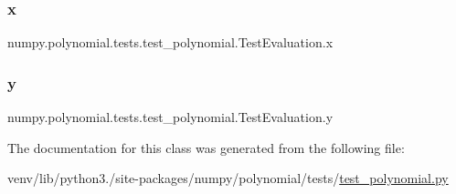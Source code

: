 \subsubsection{\texorpdfstring{x}{x}}
{\footnotesize\ttfamily numpy.\+polynomial.\+tests.\+test\+\_\+polynomial.\+Test\+Evaluation.\+x\hspace{0.3cm}{\ttfamily [static]}}

\mbox{\label{classnumpy_1_1polynomial_1_1tests_1_1test__polynomial_1_1TestEvaluation_a8169409047fd07dce7588fe2c25d59bf}} 
\subsubsection{\texorpdfstring{y}{y}}
{\footnotesize\ttfamily numpy.\+polynomial.\+tests.\+test\+\_\+polynomial.\+Test\+Evaluation.\+y\hspace{0.3cm}{\ttfamily [static]}}



The documentation for this class was generated from the following file\+:\begin{DoxyCompactItemize}
\item 
venv/lib/python3./site-\/packages/numpy/polynomial/tests/\hyperlink{polynomial_2tests_2test__polynomial_8py}{test\+\_\+polynomial.\+py}\end{DoxyCompactItemize}
